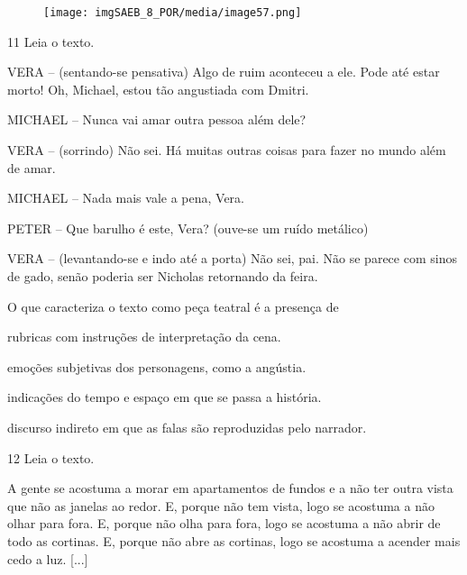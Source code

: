 \begin{figure}[H]
\texttt{[image: imgSAEB\_8\_POR/media/image57.png]}
\end{figure}

\pagebreak

\num{11} Leia o texto.

\begin{myquote}
VERA -- (sentando-se pensativa) Algo de ruim aconteceu a ele. Pode até
estar morto! Oh, Michael, estou tão angustiada com Dmitri.

MICHAEL -- Nunca vai amar outra pessoa além dele?

VERA -- (sorrindo) Não sei. Há muitas outras coisas para fazer no mundo
além de amar.

MICHAEL -- Nada mais vale a pena, Vera.

PETER -- Que barulho é este, Vera? (ouve-se um ruído metálico)

VERA -- (levantando-se e indo até a porta) Não sei, pai. Não se parece
com sinos de gado, senão poderia ser Nicholas retornando da feira.

\end{myquote}

O que caracteriza o texto como peça teatral é a presença de

\begin{escolha}
\item rubricas com instruções de interpretação da cena.

\item emoções subjetivas dos personagens, como a angústia.

\item indicações do tempo e espaço em que se passa a história.

\item discurso indireto em que as falas são reproduzidas pelo narrador.
\end{escolha}

\num{12} Leia o texto.

\begin{myquote}
A gente se acostuma a morar em apartamentos de fundos e a não ter outra
vista que não as janelas ao redor. E, porque não tem vista, logo se
acostuma a não olhar para fora. E, porque não olha para fora, logo se
acostuma a não abrir de todo as cortinas. E, porque não abre as
cortinas, logo se acostuma a acender mais cedo a luz. {[}...{]}

\end{myquote}

